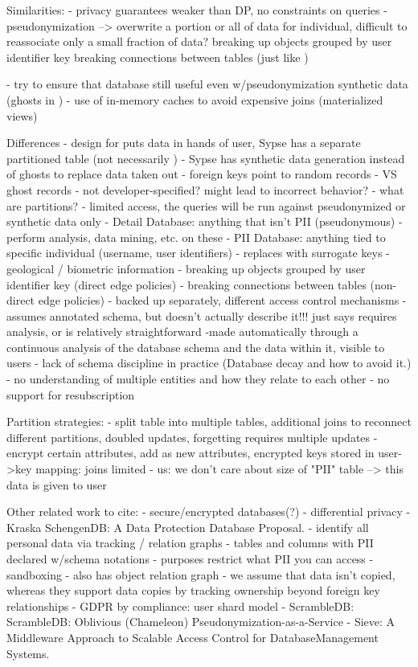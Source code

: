 Similarities:
- privacy guarantees weaker than DP, no constraints on queries
- pseudonymization --> overwrite a portion or all of data for individual, difficult to reassociate
    only a small fraction of data?
    breaking up objects grouped by user identifier key
    breaking connections between tables (just like )

- try to ensure that database still useful even w/pseudonymization
    synthetic data (ghosts in \name)
- use of in-memory caches to avoid expensive joins (materialized views)

Differences
- design for \name puts data in hands of user, Sypse has a separate partitioned table (not
necessarily )
- Sypse has synthetic data generation instead of ghosts to replace data taken out
    - foreign keys point to random records
    - VS ghost records
    - not developer-specified? might lead to incorrect behavior?
- what are partitions?
    - limited access, the queries will be run against pseudonymized or synthetic data only
    - Detail Database: anything that isn't PII (pseudonymous)
        - perform analysis, data mining, etc. on these
    - PII Database: anything tied to specific individual (username, user identifiers)
        - replaces with surrogate keys
        - geological / biometric information
        - breaking up objects grouped by user identifier key (direct edge policies)
        - breaking connections between tables (non-direct edge policies)
    - backed up separately, different access control mechanisms
- assumes annotated schema, but doesn't actually describe it!!! just says requires analysis, or is
relatively straightforward
    -made automatically through a continuous analysis of the database schema and the data within it,
    visible to users
    - lack of schema discipline in practice (Database decay and how to avoid it.)
    - no understanding of multiple entities and how they relate to each other
- no support for resubscription

Partition strategies:
- split table into multiple tables, additional joins to reconnect different partitions, doubled updates, forgetting requires multiple
updates
- encrypt certain attributes, add as new attributes, encrypted keys stored in user->key mapping: joins limited
- us: we don't care about size of "PII" table --> this data is given to user

Other related work to cite:
- secure/encrypted databases(?)
- differential privacy
- Kraska SchengenDB: A Data Protection Database Proposal.
    - identify all personal data via tracking / relation graphs
    - tables and columns with PII declared w/schema notations
    - purposes restrict what PII you can access
    - sandboxing
    - also has object relation graph
    - we assume that data isn't copied, whereas they support data copies by tracking ownership
    beyond foreign key relationships
- GDPR by compliance: user shard model
- ScrambleDB: ScrambleDB: Oblivious (Chameleon) Pseudonymization-as-a-Service
- Sieve: A Middleware Approach to Scalable Access Control for DatabaseManagement Systems.

